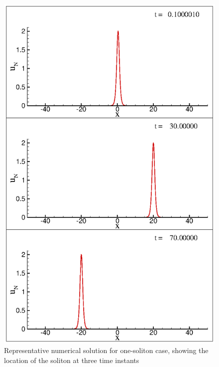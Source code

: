 \begin{figure}
\centerline{
\includegraphics[width=0.5\linewidth]{Fig_11}
}
\caption{Representative numerical solution for one-soliton case, showing the location of the soliton at three time instants}
\label{fig:one0}
\end{figure}

